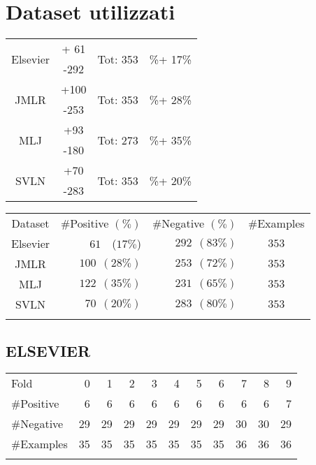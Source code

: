 \section{Dataset utilizzati}

\begin{table}[htbp]
	\centering
	\begin{tabular}{c | c | c | c}
		\multirow{2}{*}{Elsevier} & + 61 & \multirow{2}{*}{Tot: 353}& \multirow{2}{*}{\%+ 17\%} \\
		 & -292 &  & \\
		 \multirow{2}{*}{JMLR} & +100 & \multirow{2}{*}{Tot: 353} & \multirow{2}{*}{\%+ 28\%} \\
		 & -253 & & \\
 		 \multirow{2}{*}{MLJ} & +93 & \multirow{2}{*}{Tot: 273} & \multirow{2}{*}{\%+ 35\%} \\
 		 & -180 & & \\
 		 \multirow{2}{*}{SVLN} & +70 & \multirow{2}{*}{Tot: 353} & \multirow{2}{*}{\%+ 20\%} \\
 		 & -283 & & \\
		\end{tabular}%
	\label{tab:}
\end{table}

\begin{table}[htbp]
	\label{tab:datasets}
	\centering
	\begin{tabular}{c@{\qquad}r@{\qquad}r@{\qquad}c}
\toprule
\addlinespace
Dataset & \#Positive $(\%)$ & \#Negative $(\%)$ & \#Examples \\
\addlinespace
\midrule
\addlinespace
Elsevier & $61$~~($17\%$) & $292~~(83\%)$ & $353$ \\
JMLR     & $100~~(28\%)$ & $253~~(72\%)$ & $353$ \\
MLJ      & $122~~(35\%)$ & $231~~(65\%)$ & $353$ \\
SVLN     & $70~~(20\%)$ & $283~~(80\%)$ & $353$ \\
\addlinespace
\bottomrule
	\end{tabular}
\end{table}



\subsection{ELSEVIER}
\begin{table}[htbp]
	\centering
		\begin{tabular}{l@{\qquad}*{10}{r}}
		\toprule
\addlinespace
			Fold &  0 &  1 &  2 &  3 &  4 &  5 &  6 &  7 &  8 &  9 \\
\addlinespace
\midrule
\addlinespace
\#Positive  & 6  & 6  &  6 &  6 &  6 &  6 &  6 &  6 &  6 &  7 \\
\#Negative  & 29 & 29 & 29 & 29 & 29 & 29 & 29 & 30 & 30 & 29 \\
\#Examples & 35 & 35 & 35 & 35 & 35 & 35 & 35 & 36 & 36 & 36 \\
\addlinespace
\bottomrule
		\end{tabular}
	\label{tab:Elsevier}
\end{table}
